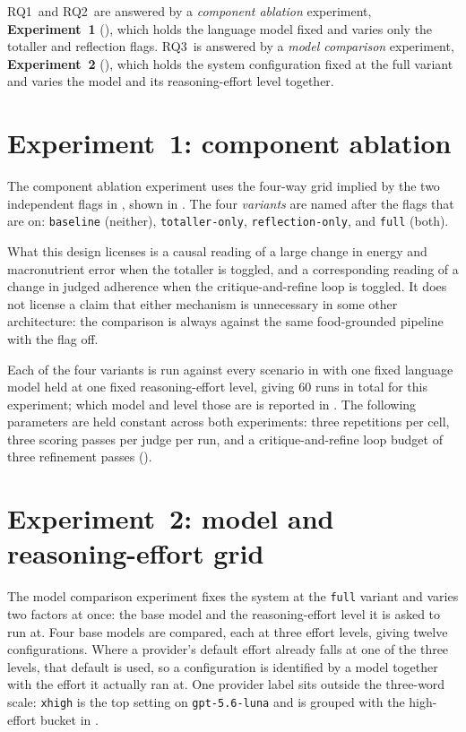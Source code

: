 RQ1~and RQ2~are answered by a \emph{component ablation} experiment, \textbf{Experiment~1} (), which holds the language model fixed and varies only the totaller and reflection flags. RQ3~is answered by a \emph{model comparison} experiment, \textbf{Experiment~2} (), which holds the system configuration fixed at the full variant and varies the model and its reasoning-effort level together.

\section{Experiment~1: component ablation}
\label{sec:methodology-variants}

The component ablation experiment uses the four-way grid implied by the two independent flags in , shown in . The four \emph{variants} are named after the flags that are on: \texttt{baseline} (neither), \texttt{totaller-only}, \texttt{reflection-only}, and \texttt{full} (both).

What this design licenses is a causal reading of a large change in energy and macronutrient error when the totaller is toggled, and a corresponding reading of a change in judged adherence when the critique-and-refine loop is toggled. It does not license a claim that either mechanism is unnecessary in some other architecture: the comparison is always against the same food-grounded pipeline with the flag off.

Each of the four variants is run against every scenario in  with one fixed language model held at one fixed reasoning-effort level, giving \num{60} runs in total for this experiment; which model and level those are is reported in . The following parameters are held constant across both experiments: three repetitions per cell, three scoring passes per judge per run, and a critique-and-refine loop budget of three refinement passes ().

\section{Experiment~2: model and reasoning-effort grid}
\label{sec:methodology-model-grid}

The model comparison experiment fixes the system at the \texttt{full} variant and varies two factors at once: the base model and the reasoning-effort level it is asked to run at. Four base models are compared, each at three effort levels, giving twelve configurations. Where a provider's default effort already falls at one of the three levels, that default is used, so a configuration is identified by a model together with the effort it actually ran at. One provider label sits outside the three-word scale: \texttt{xhigh} is the top setting on \texttt{gpt-5.6-luna} and is grouped with the high-effort bucket in .

